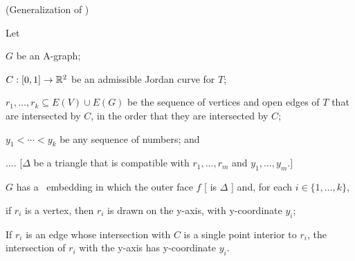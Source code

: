 \begin{thm}
(Generalization of )

   Let
   \begin{compactenum}
     \item  $G$ be an A-graph;
     \item  $C:[0,1]\to\mathbb{R}^2$ be an admissible Jordan curve for $T$;
     \item $r_1,\ldots,r_k \subseteq E(V)\cup E(G)$ be the sequence of vertices and open edges
           of $T$ that are intersected by $C$, in the order
           that they are intersected by $C$;
     \item $y_1<\cdots<y_k$ be any sequence of numbers; and
     \item .... [$\Delta$ be a triangle that is compatible with 
           $r_1,\ldots,r_m$ and $y_1,\ldots,y_m$.]
  \end{compactenum}
$G$ has a
   \Fary\ embedding in which the outer face $f$ [ is $\Delta$ ]
   and, for each $i\in\{1,\ldots,k\}$, 
   \begin{compactenum}
       \item if $r_i$ is a vertex, then $r_i$ is drawn on the y-axis, with y-coordinate $y_i$;
       \item If $r_i$ is an edge whose intersection with $C$ is a
         single point interior to $r_i$, 
         the intersection of $r_i$ with the
         y-axis has y-coordinate
         $y_i$.
   \end{compactenum}
\end{thm}

